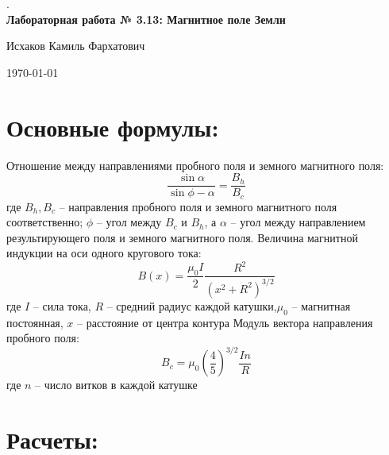 \documentclass{article}%
\begin{document}
%
\normalsize%
\begin{center}%
.\\%
\vspace{12cm}%
\textbf{Лабораторная работа № 3.13: Магнитное поле Земли}%
\end{center}%
\begin{center}%
Исхаков Камиль Фархатович%
\end{center}%
\begin{center}%
\today%
\end{center}%
\newpage%
\section{Основные формулы:}%
\label{sec:}%

%
Отношение между направлениями пробного поля и земного магнитного поля:\begin{displaymath}{\frac{\sin{\alpha}}{\sin{\phi-\alpha}}} = {\frac{B_h}{B_c}}\end{displaymath}%
\newline%
где $B_h, B_c$ – направления пробного поля и земного магнитного поля соответственно; $\phi$ – угол между $B_c$ и $B_h$, а $\alpha$ – угол между направлением результирующего поля и земного магнитного поля.%
\newline%
Величина магнитной индукции на оси одного кругового тока:\begin{displaymath}B(x) = \frac{\mu_0 I}{2} \frac{R^2}{(x^2+R^2)^{3/2}}\end{displaymath}%
\newline%
где $I$ – сила тока, $R$ – средний радиус каждой катушки,$\mu_0$ – магнитная постоянная, $x$ – расстояние от центра контура%
\newline%
Модуль вектора направления пробного поля:\begin{displaymath}B_c = \mu_0 \left(\frac{4}{5}\right)^{3/2} \frac{I n}{R}\end{displaymath}%
\newline%
где $n$ – число витков в каждой катушке%
\newline%
\section{Расчеты:}%
\label{sec:}%

%
\end{document}
